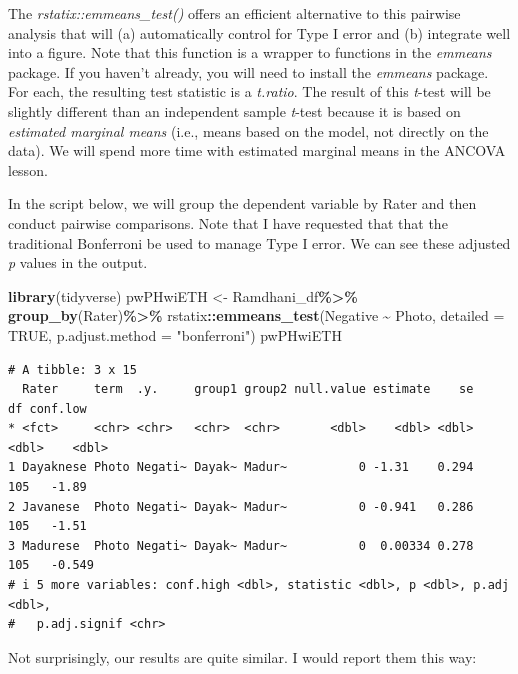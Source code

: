 \documentclass[
  11pt,
]{book}
\newenvironment{Shaded}{\begin{snugshade}}{\end{snugshade}}
\newcommand{\AttributeTok}[1]{\textcolor[rgb]{0.27,0.27,0.27}{#1}}
\newcommand{\ConstantTok}[1]{\textcolor[rgb]{0.37,0.37,0.37}{#1}}
\newcommand{\FunctionTok}[1]{\textcolor[rgb]{0.27,0.27,0.27}{\textbf{#1}}}
\newcommand{\NormalTok}[1]{#1}
\newcommand{\OtherTok}[1]{\textcolor[rgb]{0.37,0.37,0.37}{#1}}
\newcommand{\SpecialCharTok}[1]{\textcolor[rgb]{0.43,0.43,0.43}{\textbf{#1}}}
\newcommand{\StringTok}[1]{\textcolor[rgb]{0.5,0.5,0.5}{#1}}
\begin{document}
The \emph{rstatix::emmeans\_test()} offers an efficient alternative to this pairwise analysis that will (a) automatically control for Type I error and (b) integrate well into a figure. Note that this function is a wrapper to functions in the \emph{emmeans} package. If you haven't already, you will need to install the \emph{emmeans} package. For each, the resulting test statistic is a \emph{t.ratio}. The result of this \emph{t}-test will be slightly different than an independent sample \emph{t}-test because it is based on \emph{estimated marginal means} (i.e., means based on the model, not directly on the data). We will spend more time with estimated marginal means in the ANCOVA lesson.

In the script below, we will group the dependent variable by Rater and then conduct pairwise comparisons. Note that I have requested that that the traditional Bonferroni be used to manage Type I error. We can see these adjusted \emph{p} values in the output.

\begin{Shaded}
\begin{Highlighting}[]
\FunctionTok{library}\NormalTok{(tidyverse)}
\NormalTok{pwPHwiETH }\OtherTok{\textless{}{-}}\NormalTok{ Ramdhani\_df}\SpecialCharTok{\%\textgreater{}\%}
  \FunctionTok{group\_by}\NormalTok{(Rater)}\SpecialCharTok{\%\textgreater{}\%}
\NormalTok{  rstatix}\SpecialCharTok{::}\FunctionTok{emmeans\_test}\NormalTok{(Negative }\SpecialCharTok{\textasciitilde{}}\NormalTok{ Photo, }\AttributeTok{detailed =} \ConstantTok{TRUE}\NormalTok{, }\AttributeTok{p.adjust.method =} \StringTok{"bonferroni"}\NormalTok{)}
\NormalTok{pwPHwiETH}
\end{Highlighting}
\end{Shaded}

\begin{verbatim}
# A tibble: 3 x 15
  Rater     term  .y.     group1 group2 null.value estimate    se    df conf.low
* <fct>     <chr> <chr>   <chr>  <chr>       <dbl>    <dbl> <dbl> <dbl>    <dbl>
1 Dayaknese Photo Negati~ Dayak~ Madur~          0 -1.31    0.294   105   -1.89 
2 Javanese  Photo Negati~ Dayak~ Madur~          0 -0.941   0.286   105   -1.51 
3 Madurese  Photo Negati~ Dayak~ Madur~          0  0.00334 0.278   105   -0.549
# i 5 more variables: conf.high <dbl>, statistic <dbl>, p <dbl>, p.adj <dbl>,
#   p.adj.signif <chr>
\end{verbatim}

Not surprisingly, our results are quite similar. I would report them this way:
\end{document}
